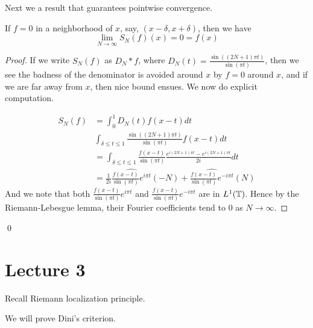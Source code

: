 Next we a result that guarantees pointwise convergence.
\begin{theorem}
    If $f=0$ in a neighborhood of $x$, say, $(x-\delta, x+\delta)$, then we have
    \begin{equation*}
        \lim_{N\to\infty}S_N(f)(x)=0=f(x)
    \end{equation*}
\end{theorem}
\begin{proof}
    If we write $S_N(f)$ as $D_N\ast f$, where $D_N(t)=\frac{\sin((2N+1)\pi t)}{\sin(\pi t)}$, then we see the badness of the denominator is avoided around $x$ by $f=0$ around $x$, and if we are far away from $x$, then nice bound ensues. We now do explicit computation.

    \begin{align*}
        S_N(f)&=\int_0^1 D_N(t)f(x-t)dt\\
        &\int_{\delta\leq t\leq 1}\frac{\sin((2N+1)\pi t)}{\sin(\pi t)}f(x-t)dt\\
        &=\int_{\delta\leq t\leq 1}\frac{f(x-t)}{\sin(\pi t)}\frac{e^{i(2N+1)\pi t}-e^{i(2N+1)\pi t}}{2i}dt\\
        &=\frac{1}{2i}\widehat{\frac{f(x-t)}{\sin(\pi t)}e^{i\pi t}}(-N)+\widehat{\frac{f(x-t)}{\sin(\pi t)}e^{-i\pi t}}(N)
    \end{align*}
    And we note that both $\frac{f(x-t)}{\sin(\pi t)}e^{i\pi t}$ and $\frac{f(x-t)}{\sin(\pi t)}e^{-i\pi t}$ are in $L^1(\mathbb{T})$. Hence by the Riemann-Lebesgue lemma, their Fourier coefficients tend to 0 as $N\to\infty$. 
\end{proof}
\qed


\section{Lecture 3}
Recall Riemann localization principle.
\begin{remark}
    
\end{remark}

We will prove Dini's criterion.

